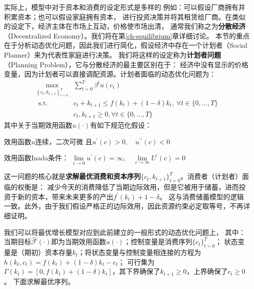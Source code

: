 实际上，模型中对于资本和消费的设定形式是多样的.例如：可以假设厂商拥有并积累资本；也可以假设家庭拥有资本，
进行投资决策并将其租赁给厂商。在类似的设定下，经济主体在市场上互动，价格使市场出清，
通常我们称之为\textbf{分散经济}（Decentralized Economy）。我们将在第\ref{ch-equilibrium}章详细讨论。
本节的重点在于分析动态优化问题，因此我们进行简化，假设经济中存在一个计划者（Social Planner）来为代表性家庭进行决策。
我们将这样的设定称为\textbf{计划者问题}（Planning Problem），它与分散经济的最主要区别在于：
经济中没有显示的价格变量，因为计划者可以直接调配资源。计划者面临的动态优化问题为：
\begin{equation}
    \begin{aligned}
        \max _{\left\{c_t, k_{t+1}\right\}_{t=0}^T} & \sum_{t=0}^T \beta^t u\left(c_t\right) \\
            \text { s.t. } & c_t+k_{t+1} \leq f\left(k_t\right)+(1-\delta) k_t, ~\forall t \in\{0, \ldots, T\} \\
            & c_t, k_{t+1} \geq 0, \forall t \in\{0, \ldots, T\}
    \end{aligned}
    \tag{P3} \label{problem-rck-planer}
\end{equation}
其中关于当期效用函数$u(\cdot)$有如下规范化假设：
\begin{assumption} \label{as-u}
    效用函数$u$连续，二次可微
        且$u^{\prime}\left(c\right)>0,\quad u^{\prime\prime}\left(c\right)<0$
\end{assumption}
\begin{assumption} \label{as-u-inada}
    效用函数Inada条件：
    $\lim\limits_{c \rightarrow 0} u^{\prime}(c)=\infty, \quad \lim\limits_{c \rightarrow \infty} U^{\prime}(c)=0$
\end{assumption}
这一问题的核心就是\textbf{求解最优消费和资本序列}$\{c_t,k_{t+1}\}_{t=0}^T$。消费者（计划者）面临的权衡是：
减少今天的消费降低了当期边际效用，但是它被用于储蓄，进而投资于新的资本，带来未来更多的产出$f^{\prime}(k_t)+1-\delta$。
这与消费储蓄模型的逻辑一致。此外，由于我们假设严格正的边际效用，因此资源约束必定取等号，不再详细证明。

我们可以将最优增长模型对应到此前建立的一般形式的动态优化问题上，
其中：当期目标$\hat{\mathcal{F}}(\cdot)$即为当期效用函数$u(\cdot)$；控制变量是消费序列$\{c_t\}_{t=0}^T$；
状态变量是（期初）资本存量$k_t$；将状态变量与控制变量相连接的方程为$h(k_t,c_t) = f(k_t)+(1-\delta)k_t-c_t$；
可行集为$\Gamma\left(k_t\right)=\left[0,f(k_t)+(1-\delta)k_t\right]$，其下界确保了$k_{t+1}\geq 0$，上界确保了$c_t\geq 0$。
下面求解最优序列。


